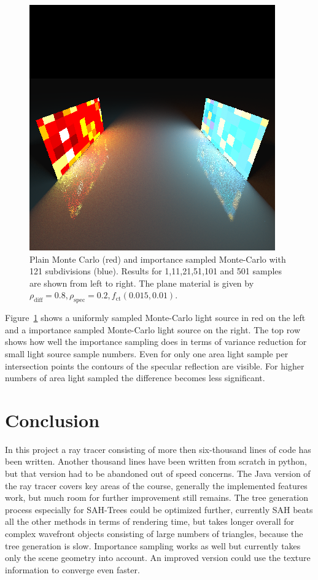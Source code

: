 \begin{figure}
\includegraphics[width=0.3\linewidth]{./img/twoAI/501}
\caption{Plain Monte Carlo (red) and importance sampled Monte-Carlo with 121 subdivisions (blue). Results for 1,11,21,51,101 and 501 samples are shown from left to right. The plane material is given by $\rho_{\text{diff}} = 0.8,  \rho_{\text{spec}} = 0.2, f_{\text{ct}}(0.015,0.01)$.}
\label{fig:twoLight}
\end{figure}

Figure~\ref{fig:twoLight} shows a uniformly sampled Monte-Carlo light source in red on the left and a importance sampled Monte-Carlo light source on the right. The top row shows how well the importance sampling does in terms of variance reduction for small light source sample numbers. Even for only one area light sample per intersection points the contours of the specular reflection are visible. For higher numbers of area light sampled the difference becomes less significant.

\section{Conclusion}
In this project a ray tracer consisting of more then six-thousand lines of code has been written. Another thousand lines have been written from scratch in python, but that version had to be abandoned out of speed concerns. The Java version of the ray tracer covers key areas of the course, generally the implemented features work, but much room for further improvement still remains. The tree generation process especially for SAH-Trees could be optimized further, currently SAH beats all the other methods in terms of rendering time, but takes longer overall for complex wavefront objects consisting of large numbers of triangles, because the tree generation is slow.  Importance sampling works as well but currently takes only the scene geometry into account. An improved version could use the texture information to converge even faster. 



